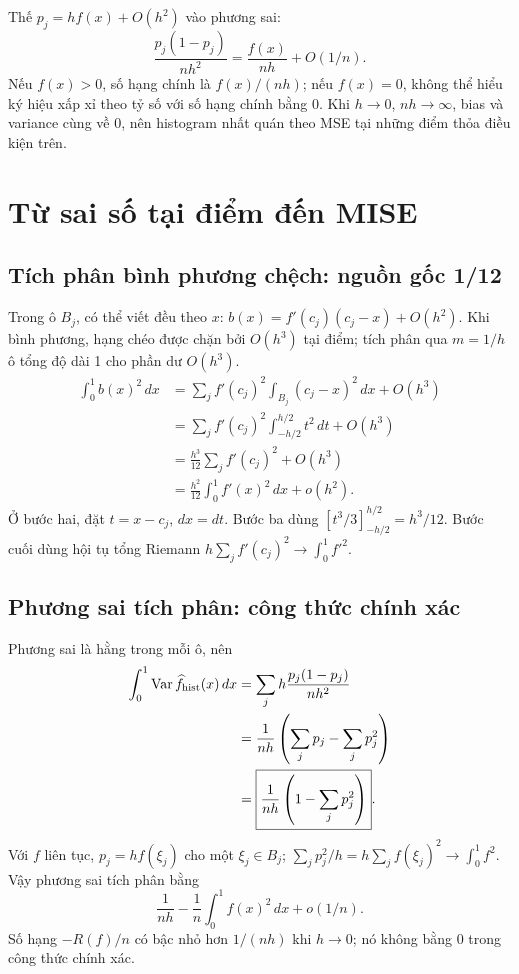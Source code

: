 Thế $p_j=hf(x)+O(h^2)$ vào phương sai:
\[
\frac{p_j(1-p_j)}{nh^2}
=\frac{f(x)}{nh}+O(1/n).
\]
Nếu $f(x)>0$, số hạng chính là $f(x)/(nh)$; nếu $f(x)=0$, không thể
hiểu ký hiệu xấp xỉ theo tỷ số với số hạng chính bằng 0.
Khi $h\to0$, $nh\to\infty$, bias và variance cùng về 0, nên histogram
nhất quán theo MSE tại những điểm thỏa điều kiện trên.

\section{Từ sai số tại điểm đến MISE}
\subsection{Tích phân bình phương chệch: nguồn gốc 1/12}
Trong ô $B_j$, có thể viết đều theo $x$:
$b(x)=f'(c_j)(c_j-x)+O(h^2)$.
Khi bình phương, hạng chéo được chặn bởi $O(h^3)$ tại điểm;
tích phân qua $m=1/h$ ô tổng độ dài 1 cho phần dư $O(h^3)$.
\begin{align*}
\int_0^1b(x)^2\,dx
&=\sum_j f'(c_j)^2\int_{B_j}(c_j-x)^2\,dx+O(h^3)\\
&=\sum_j f'(c_j)^2\int_{-h/2}^{h/2}t^2\,dt+O(h^3)\\
&=\frac{h^3}{12}\sum_j f'(c_j)^2+O(h^3)\\
&=\frac{h^2}{12}\int_0^1f'(x)^2\,dx+o(h^2).
\end{align*}
Ở bước hai, đặt $t=x-c_j$, $dx=dt$. Bước ba dùng
$[t^3/3]_{-h/2}^{h/2}=h^3/12$. Bước cuối dùng hội tụ tổng Riemann
$h\sum_j f'(c_j)^2\to\int_0^1f'^2$.

\subsection{Phương sai tích phân: công thức chính xác}
Phương sai là hằng trong mỗi ô, nên
\begin{align*}
\int_0^1\operatorname{Var}\widehat f_{\rm hist}(x)\,dx
&=\sum_jh\frac{p_j(1-p_j)}{nh^2}\\
&=\frac1{nh}\left(\sum_jp_j-\sum_jp_j^2\right)\\
&=\boxed{\frac1{nh}\left(1-\sum_jp_j^2\right)}.
\end{align*}
Với $f$ liên tục, $p_j=hf(\xi_j)$ cho một $\xi_j\in B_j$;
$\sum_jp_j^2/h=h\sum_j f(\xi_j)^2\to\int_0^1 f^2$.
Vậy phương sai tích phân bằng
\[
\frac1{nh}-\frac1n\int_0^1f(x)^2\,dx+o(1/n).
\]
Số hạng $-R(f)/n$ có bậc nhỏ hơn $1/(nh)$ khi $h\to0$;
nó không bằng 0 trong công thức chính xác.

